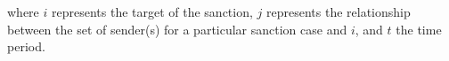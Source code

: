 where $i$ represents the target of the sanction, $j$ represents the relationship between the set of sender(s) for a particular sanction case and $i$, and $t$ the time period.





